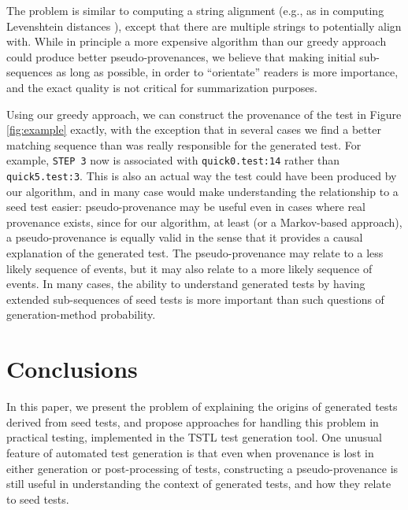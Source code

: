 \documentclass[final]{article}
\begin{document}
The problem is similar to computing a string alignment (e.g., as in
computing Levenshtein distances \cite{lev}), except that there are
multiple strings to potentially align with.  While in principle a more
expensive algorithm than our greedy approach could produce better
pseudo-provenances, we believe that making initial sub-sequences as
long as possible, in order to ``orientate'' readers is more
importance, and the exact quality is not critical for summarization
purposes.

Using our greedy approach, we can construct the provenance of the test
in Figure \ref{fig:example} exactly, with the exception that in
several cases we find a better matching sequence than was really
responsible for the generated test.  For example, {\tt STEP 3} now is
associated with {\tt quick0.test:14} rather than {\tt quick5.test:3}.
This is also an actual way the test could have been produced by our
algorithm, and in many case would make understanding the relationship
to a seed test easier:  pseudo-provenance may be useful even in cases
where real provenance exists, since for our algorithm, at least (or a
Markov-based approach), a pseudo-provenance is equally valid in the
sense that it provides a causal explanation of the generated test.
The pseudo-provenance may relate to a less likely sequence of events,
but it may also relate to a more likely sequence of events.  In many
cases, the ability to understand generated tests by having extended
sub-sequences of seed tests is more important than such questions of
generation-method probability.

\section{Conclusions}

In this paper, we present the problem of explaining the origins of
generated tests derived from seed tests, and propose approaches for
handling this problem in practical testing, implemented in the TSTL
test generation tool.  One unusual feature of automated test
generation is that even when provenance is lost in either generation
or post-processing of tests, constructing a pseudo-provenance is still
useful in understanding the context of generated tests, and how they
relate to seed tests.





\end{document}
